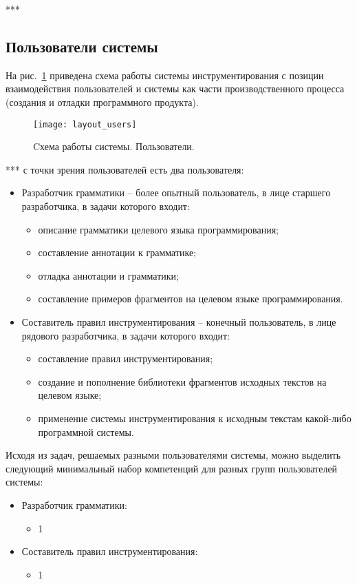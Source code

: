 ***

\subsection{Пользователи системы}

На рис.~\ref{fig:layout_users} приведена схема работы системы инструментирования с позиции взаимодействия пользователей и системы как части производственного процесса (создания и отладки программного продукта).

\begin{figure}[h]
	\centering
	\texttt{[image: layout\_users]}
	\caption{Cхема работы системы. Пользователи.}
	\label{fig:layout_users}
\end{figure}

***
с точки зрения пользователей есть два пользователя:

\begin{itemize}
  \item Разработчик грамматики -- более опытный пользователь, в лице старшего разработчика, в задачи которого входит:
    \begin{itemize}
      \item описание грамматики целевого языка программирования;
      \item составление аннотации к грамматике;
      \item отладка аннотации и грамматики;
      \item составление примеров фрагментов на целевом языке программирования.
    \end{itemize}

  \item Составитель правил инструментирования -- конечный пользователь, в лице рядового разработчика, в задачи которого входит:
    \begin{itemize}
      \item составление правил инструментирования;
      \item создание и пополнение библиотеки фрагментов исходных текстов на целевом языке;
      \item применение системы инструментирования к исходным текстам какой-либо программной системы.
    \end{itemize}
\end{itemize}

Исходя из задач, решаемых разными пользователями системы, можно выделить следующий минимальный набор компетенций для разных групп пользователей системы:
\begin{itemize}
  \item Разработчик грамматики:
    \begin{itemize}
      \item 1
    \end{itemize}

  \item Составитель правил инструментирования:
    \begin{itemize}
      \item 1
    \end{itemize}
\end{itemize}


